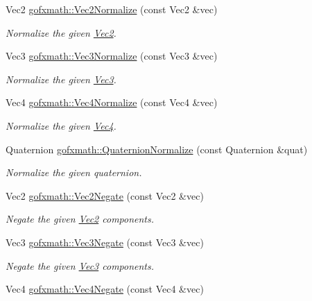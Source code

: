 \begin{DoxyCompactItemize}
Vec2 \hyperlink{group___s_i_s_d_vec_math_gaa0125e18e221531bfc7d72d47cdf42d9}{gofxmath\+::\+Vec2\+Normalize} (const Vec2 \&vec)
\begin{DoxyCompactList}\small\item\em Normalize the given \hyperlink{classgofxmath_1_1_vec2}{Vec2}. \end{DoxyCompactList}\item 
Vec3 \hyperlink{group___s_i_s_d_vec_math_gafdbff8ff3fad75f9a9e924a58fcc4f4a}{gofxmath\+::\+Vec3\+Normalize} (const Vec3 \&vec)
\begin{DoxyCompactList}\small\item\em Normalize the given \hyperlink{classgofxmath_1_1_vec3}{Vec3}. \end{DoxyCompactList}\item 
Vec4 \hyperlink{group___s_i_s_d_vec_math_gaf1fa3fbf9843a509f3b8a476aa18361b}{gofxmath\+::\+Vec4\+Normalize} (const Vec4 \&vec)
\begin{DoxyCompactList}\small\item\em Normalize the given \hyperlink{classgofxmath_1_1_vec4}{Vec4}. \end{DoxyCompactList}\item 
Quaternion \hyperlink{group___s_i_s_d_vec_math_ga0b4dfb2804fb5c44a112dc6b8ea43278}{gofxmath\+::\+Quaternion\+Normalize} (const Quaternion \&quat)
\begin{DoxyCompactList}\small\item\em Normalize the given quaternion. \end{DoxyCompactList}\item 
Vec2 \hyperlink{group___s_i_s_d_vec_math_ga55959c707ef1b444eb2d71009a201aa2}{gofxmath\+::\+Vec2\+Negate} (const Vec2 \&vec)
\begin{DoxyCompactList}\small\item\em Negate the given \hyperlink{classgofxmath_1_1_vec2}{Vec2} components. \end{DoxyCompactList}\item 
Vec3 \hyperlink{group___s_i_s_d_vec_math_ga8ccc52146f984a79c566ee8348e410e2}{gofxmath\+::\+Vec3\+Negate} (const Vec3 \&vec)
\begin{DoxyCompactList}\small\item\em Negate the given \hyperlink{classgofxmath_1_1_vec3}{Vec3} components. \end{DoxyCompactList}\item 
Vec4 \hyperlink{group___s_i_s_d_vec_math_ga9ba6951d54c6a4d9d513580f5bf3b928}{gofxmath\+::\+Vec4\+Negate} (const Vec4 \&vec)

\end{DoxyCompactItemize}
